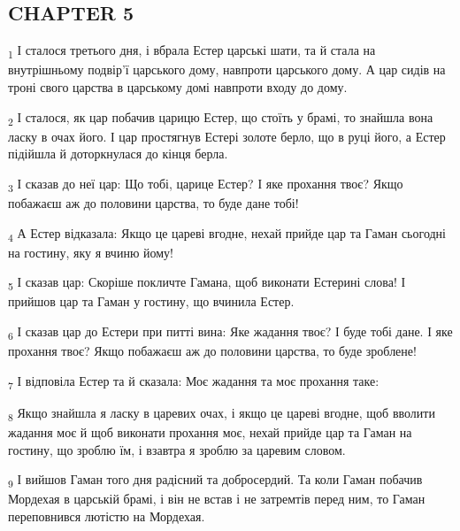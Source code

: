 \subsection{CHAPTER 5}
\begin{tcolorbox}
\textsubscript{1} І сталося третього дня, і вбрала Естер царські шати, та й стала на внутрішньому подвір'ї царського дому, навпроти царського дому. А цар сидів на троні свого царства в царському домі навпроти входу до дому.
\end{tcolorbox}
\begin{tcolorbox}
\textsubscript{2} І сталося, як цар побачив царицю Естер, що стоїть у брамі, то знайшла вона ласку в очах його. І цар простягнув Естері золоте берло, що в руці його, а Естер підійшла й доторкнулася до кінця берла.
\end{tcolorbox}
\begin{tcolorbox}
\textsubscript{3} І сказав до неї цар: Що тобі, царице Естер? І яке прохання твоє? Якщо побажаєш аж до половини царства, то буде дане тобі!
\end{tcolorbox}
\begin{tcolorbox}
\textsubscript{4} А Естер відказала: Якщо це цареві вгодне, нехай прийде цар та Гаман сьогодні на гостину, яку я вчиню йому!
\end{tcolorbox}
\begin{tcolorbox}
\textsubscript{5} І сказав цар: Скоріше покличте Гамана, щоб виконати Естерині слова! І прийшов цар та Гаман у гостину, що вчинила Естер.
\end{tcolorbox}
\begin{tcolorbox}
\textsubscript{6} І сказав цар до Естери при питті вина: Яке жадання твоє? І буде тобі дане. І яке прохання твоє? Якщо побажаєш аж до половини царства, то буде зроблене!
\end{tcolorbox}
\begin{tcolorbox}
\textsubscript{7} І відповіла Естер та й сказала: Моє жадання та моє прохання таке:
\end{tcolorbox}
\begin{tcolorbox}
\textsubscript{8} Якщо знайшла я ласку в царевих очах, і якщо це цареві вгодне, щоб вволити жадання моє й щоб виконати прохання моє, нехай прийде цар та Гаман на гостину, що зроблю їм, і взавтра я зроблю за царевим словом.
\end{tcolorbox}
\begin{tcolorbox}
\textsubscript{9} І вийшов Гаман того дня радісний та добросердий. Та коли Гаман побачив Мордехая в царській брамі, і він не встав і не затремтів перед ним, то Гаман переповнився лютістю на Мордехая.
\end{tcolorbox}
